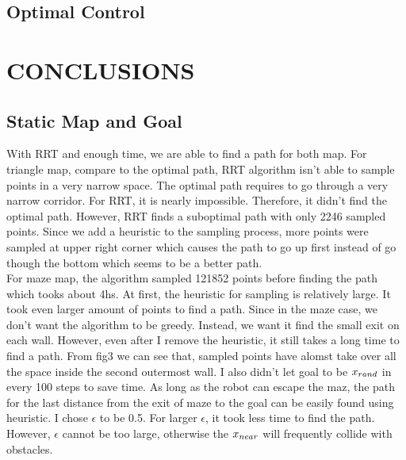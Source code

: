 \documentclass[letterpaper, 10 pt, conference]{ieeeconf}  %
\begin{document}
\subsection{Optimal Control}


\section{CONCLUSIONS}
\subsection{Static Map and Goal}
With RRT and enough time, we are able to find a path for both map. For triangle map, compare to the optimal path, RRT algorithm
isn't able to sample points in a very narrow space. The optimal path requires to go through a very narrow corridor. For RRT, it is 
nearly impossible. Therefore, it didn't find the optimal path. However, RRT finds a suboptimal path with only 2246
sampled points. Since we add a heuristic to the sampling process, more points were sampled at upper right corner which causes the
path to go up first instead of go though the bottom which seems to be a better path. \\

For maze map, the algorithm sampled 121852 points before finding the path which tooks about 4hs. At first, the heuristic for sampling
is relatively large. It took even larger amount of points to find a path. Since in the maze case, we don't want the algorithm to be 
greedy. Instead, we want it find the small exit on each wall. However, even after I remove the heuristic, it still takes a long time
to find a path. From fig3 we can see that, sampled points have alomst take over all the space inside the second outermost wall.
I also didn't let goal to be $x_{rand}$ in every 100 steps to save time. As long as the robot can escape the maz, the path for 
the last distance from the exit of maze to the goal can be easily found using heuristic. I chose $\epsilon$ to be 0.5. For 
larger $\epsilon$, it took less time to find the path. However, $\epsilon$ cannot be too large, otherwise the $x_{near}$ will frequently 
collide with obstacles. 

\end{document}
